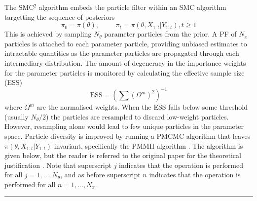 \documentclass[a4paper,12pt]{article}
\begin{document}
\noindent The SMC$^2$ algorithm \cite{Chopin2012} embeds the particle filter within an SMC algorithm targetting the sequence of posteriors
\begin{equation*}
\pi_0 = \pi(\theta), \hspace{1cm} \pi_t = \pi(\theta, X_{1:t} \vert Y_{1:t}), t \geq 1
\end{equation*}
This is achieved by sampling $N_\theta$ parameter particles from the prior.
A PF of $N_x$ particles is attached to each parameter particle, providing unbiased estimates to intractable quantities as the parameter particles are propagated through each intermediary distribution.
The amount of degeneracy in the importance weights for the parameter particles is monitored by calculating the effective sample size (ESS)
\begin{equation*}
\mbox{ESS} = \left( \sum  \left( \Omega^m \right)^2 \right)^{-1}
\end{equation*}
\noindent where $\Omega^m$ are the normalised weights.
When the ESS falls below some threshold (usually $N_\theta / 2$) the particles are resampled to discard low-weight particles.
However, resampling alone would lead to few unique particles in the parameter space.
Particle diversity is improved by running a PMCMC algorithm that leaves $\pi (\theta, X_{1:t} \vert Y_{1:t})$ invariant, specifically the PMMH algorithm \cite{Andrieu2010}.
The algorithm is given below, but the reader is referred to the original paper for the theoretical justification \cite{Chopin2012}.
Note that superscript $j$ indicates that the operation is performed for all $j = 1,...,N_{\theta}$, and as before superscript $n$ indicates that the operation is performed for all $n = 1,...,N_x$.

\noindent \rule{\textwidth}{1pt}\\
\end{document}
